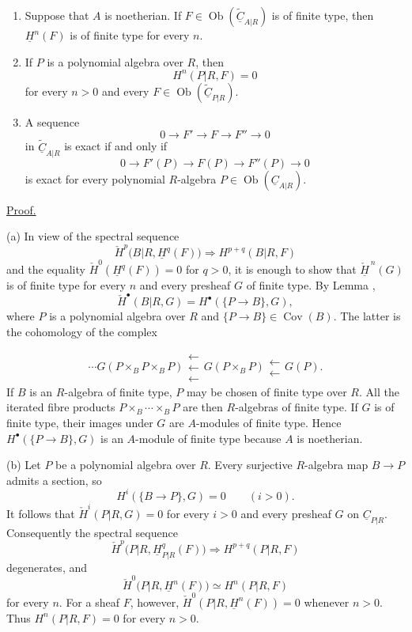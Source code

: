\begin{enumerate}[label=(\alph*)]
\item Suppose that $A$ is noetherian. If
$F\in\operatorname{Ob}(\widetilde{\underline C}_{A|R})$ is of
finite type, then $\underline H^n(F)$ is of finite type for every
$n$.

\item If $P$ is a polynomial algebra over $R$, then
\[
 H^n(P|R,F)=0
\]
for every $n>0$ and every
$F\in\operatorname{Ob}(\widetilde{\underline C}_{P|R})$.

\item A sequence
\[
 0\longrightarrow F'\longrightarrow F\longrightarrow F''
 \longrightarrow0
\]
in $\widetilde{\underline C}_{A|R}$ is exact if and only if
\[
 0\longrightarrow F'(P)\longrightarrow F(P)
 \longrightarrow F''(P)\longrightarrow0
\]
is exact for every polynomial $R$-algebra
$P\in\operatorname{Ob}(\underline C_{A|R})$.
\end{enumerate}

\underline{Proof.}

(a) In view of the spectral sequence
\[
 \check H^p\bigl(B|R,\underline H^q(F)\bigr)
 \Longrightarrow H^{p+q}(B|R,F)
\]
and the equality
$\check H^0(\underline H^q(F))=0$ for $q>0$, it is enough to show
that $\check{\underline H}^{\,n}(G)$ is of finite type for every
$n$ and every presheaf $G$ of finite type. By Lemma ,
\[
 \check H^{\bullet}(B|R,G)=
 H^{\bullet}(\{P\longrightarrow B\},G),
\]
where $P$ is a polynomial algebra over $R$ and
$\{P\longrightarrow B\}\in\operatorname{Cov}(B)$. The latter is
the cohomology of the complex


\[
 \cdots
 G(P\times_BP\times_BP)
 \mathrel{\substack{\longleftarrow\\[-.6ex]\longleftarrow\\[-.6ex]\longleftarrow}}
 G(P\times_BP)
 \mathrel{\substack{\longleftarrow\\[-.6ex]\longleftarrow}}
 G(P).
\]
If $B$ is an $R$-algebra of finite type, $P$ may be chosen of
finite type over $R$. All the iterated fibre products
$P\times_B\cdots\times_BP$ are then $R$-algebras of finite type.
If $G$ is of finite type, their images under $G$ are $A$-modules of
finite type. Hence
$H^{\bullet}(\{P\longrightarrow B\},G)$ is an $A$-module of finite
type because $A$ is noetherian.

(b) Let $P$ be a polynomial algebra over $R$. Every surjective
$R$-algebra map $B\longrightarrow P$ admits a section, so
\[
 H^i(\{B\longrightarrow P\},G)=0\qquad(i>0).
\]
It follows that $\check H^i(P|R,G)=0$ for every $i>0$ and every
presheaf $G$ on $\underline C_{P|R}$. Consequently the spectral
sequence
\[
 \check H^p\bigl(P|R,\underline H^q_{P|R}(F)\bigr)
 \Longrightarrow H^{p+q}(P|R,F)
\]
degenerates, and
\[
 \check H^0\bigl(P|R,\underline H^n(F)\bigr)
 \simeq H^n(P|R,F)
\]
for every $n$. For a sheaf $F$, however,
$\check H^0(P|R,\underline H^n(F))=0$ whenever $n>0$. Thus
$H^n(P|R,F)=0$ for every $n>0$.

